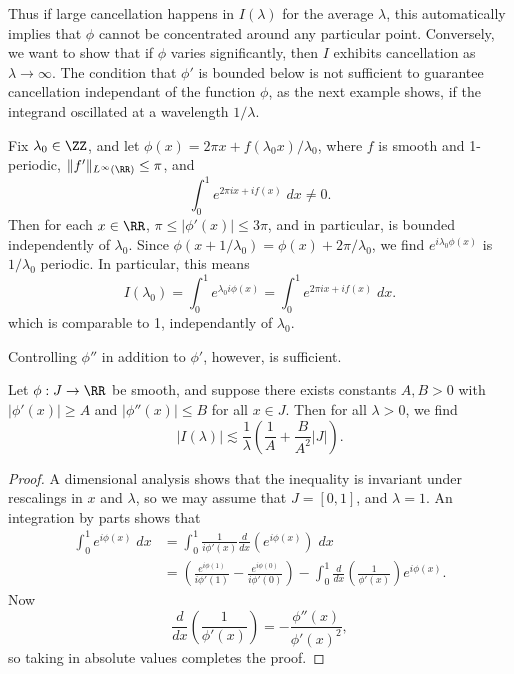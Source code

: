 Thus if large cancellation happens in $I(\lambda)$ for the average $\lambda$, this automatically implies that $\phi$ cannot be concentrated around any particular point.  Conversely, we want to show that if $\phi$ varies significantly, then $I$ exhibits cancellation as $\lambda \to \infty$. The condition that $\phi'$ is bounded below is not sufficient to guarantee cancellation independant of the function $\phi$, as the next example shows, if the integrand oscillated at a wavelength $1/\lambda$.

\begin{example}
  Fix $\lambda_0 \in \ZZ$, and let $\phi(x) = 2 \pi x + f(\lambda_0 x) / \lambda_0$, where $f$ is smooth and 1-periodic, $\| f' \|_{L^\infty(\RR)} \leq \pi$, and
  \[ \int_0^1 e^{2 \pi i x + i f(x)}\; dx \neq 0. \]
  Then for each $x \in \RR$, $\pi \leq |\phi'(x)| \leq 3\pi$, and in particular, is bounded independently of $\lambda_0$. Since $\phi(x + 1/\lambda_0) = \phi(x) + 2 \pi / \lambda_0$, we find $e^{i \lambda_0 \phi(x)}$ is $1/\lambda_0$ periodic. In particular, this means
  \[ I(\lambda_0) = \int_0^1 e^{\lambda_0 i \phi(x)} = \int_0^1 e^{2 \pi i x + i f(x)}\; dx. \]
  which is comparable to 1, independantly of $\lambda_0$.
\end{example}

Controlling $\phi''$ in addition to $\phi'$, however, is sufficient.

\begin{theorem}
  Let $\phi: J \to \RR$ be smooth, and suppose there exists constants $A,B > 0$ with $|\phi'(x)| \geq A$ and $|\phi''(x)| \leq B$ for all $x \in J$. Then for all $\lambda > 0$, we find
  \[ |I(\lambda)| \lesssim \frac{1}{\lambda} \left( \frac{1}{A} + \frac{B}{A^2} |J| \right). \]
\end{theorem}
\begin{proof}
  A dimensional analysis shows that the inequality is invariant under rescalings in $x$ and $\lambda$, so we may assume that $J = [0,1]$, and $\lambda = 1$. An integration by parts shows that
  \begin{align*}
    \int_0^1 e^{i \phi(x)}\; dx &= \int_0^1 \frac{1}{i \phi'(x)} \frac{d}{dx} \left( e^{i \phi(x)} \right)\; dx\\
    &= \left( \frac{e^{i \phi(1)}}{i \phi'(1)} - \frac{e^{i \phi(0)}}{i \phi'(0)} \right) - \int_0^1 \frac{d}{dx} \left( \frac{1}{\phi'(x)} \right) e^{i \phi(x)}.
  \end{align*}
  Now
  \[ \frac{d}{dx} \left( \frac{1}{\phi'(x)} \right) = - \frac{\phi''(x)}{\phi'(x)^2}, \]
  so taking in absolute values completes the proof.
\end{proof}

